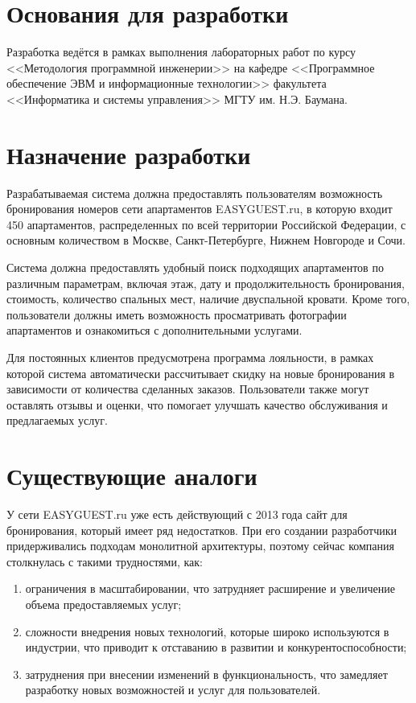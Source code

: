 
\section*{Основания для разработки}
Разработка ведётся в рамках выполнения лабораторных работ по курсу <<Методология программной инженерии>> на кафедре <<Программное обеспечение ЭВМ и информационные технологии>> факультета <<Информатика и системы управления>> МГТУ им. Н.Э. Баумана.

\section*{Назначение разработки}
Разрабатываемая система должна предоставлять пользователям возможность бронирования номеров сети апартаментов EASYGUEST.ru, в которую входит 450 апартаментов, распределенных по всей территории Российской Федерации, с основным количеством в Москве, Санкт-Петербурге, Нижнем Новгороде и Сочи. 

Система должна предоставлять удобный поиск подходящих апартаментов по различным параметрам, включая этаж, дату и продолжительность бронирования, стоимость, количество спальных мест, наличие двуспальной кровати. Кроме того, пользователи должны иметь возможность просматривать фотографии апартаментов и ознакомиться с дополнительными услугами.

Для постоянных клиентов предусмотрена программа лояльности, в рамках которой система автоматически рассчитывает скидку на новые бронирования в зависимости от количества сделанных заказов. Пользователи также могут оставлять отзывы и оценки, что помогает улучшать качество обслуживания и предлагаемых услуг.

\section*{Существующие аналоги}
У сети EASYGUEST.ru уже есть действующий с 2013 года сайт для бронирования, который имеет ряд недостатков. При его создании разработчики придерживались подходам монолитной архитектуры, поэтому сейчас компания столкнулась с такими трудностями, как:
\begin{enumerate}
    \item ограничения в масштабировании, что затрудняет расширение и увеличение объема предоставляемых услуг;
  
  \item сложности внедрения новых технологий, которые широко используются в индустрии, что приводит к отставанию в развитии и конкурентоспособности;
  
  \item затруднения при внесении изменений в функциональность, что замедляет разработку новых возможностей и услуг для пользователей.
\end{enumerate}

